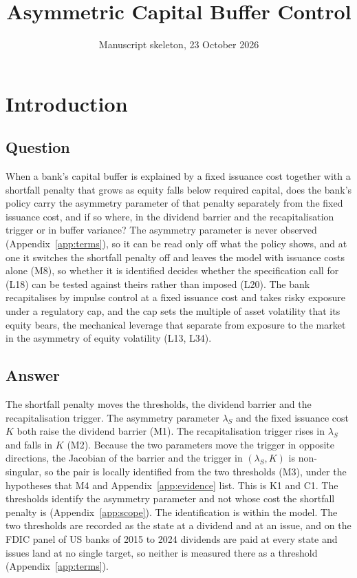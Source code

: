 \title{Asymmetric Capital Buffer Control}
\author{}
\date{Manuscript skeleton, 23 October 2026}


\maketitle

\section{Introduction}
\label{sec:intro}

\subsection{Question}

When a bank's capital buffer is explained by a fixed issuance cost together
with a shortfall penalty that grows as equity falls below required capital,
does the bank's policy carry the asymmetry parameter of that penalty separately
from the fixed issuance cost, and if so where, in the dividend barrier and the
recapitalisation trigger or in buffer variance? The asymmetry parameter is
never observed (Appendix~\ref{app:terms}), so it can be read only off what the
policy shows, and at one it switches the shortfall penalty off and leaves the
model with issuance costs alone (M8), so whether it is identified decides whether the
specification \citet{peura2006} call for (L18) can be tested against theirs
rather than imposed (L20). The bank recapitalises by impulse control at a fixed
issuance cost and takes risky exposure under a regulatory cap, and the cap sets
the multiple of asset volatility that its equity bears, the mechanical leverage
that \citet{engle2018} separate from exposure to the market in the asymmetry
of equity volatility (L13, L34).

\subsection{Answer}

The shortfall penalty moves the thresholds, the dividend barrier and the
recapitalisation trigger. The asymmetry parameter $\lambda_S$ and the
fixed issuance cost $K$ both raise the dividend barrier (M1). The
recapitalisation trigger rises in $\lambda_S$ and falls in $K$ (M2). Because the
two parameters move the trigger in opposite directions, the Jacobian of the
barrier and the trigger in $(\lambda_S,K)$ is non-singular, so the pair is
locally identified from the two thresholds (M3), under the hypotheses that M4
and Appendix~\ref{app:evidence} list. This is K1 and C1. The thresholds
identify the asymmetry parameter and not whose cost the shortfall penalty is
(Appendix~\ref{app:scope}).
The identification is within the model. The two thresholds are recorded as the
state at a dividend and at an issue, and on the FDIC panel of US banks of 2015
to 2024 dividends are paid at every state and issues land at no single target, so
neither is measured there as a threshold (Appendix~\ref{app:terms}).

